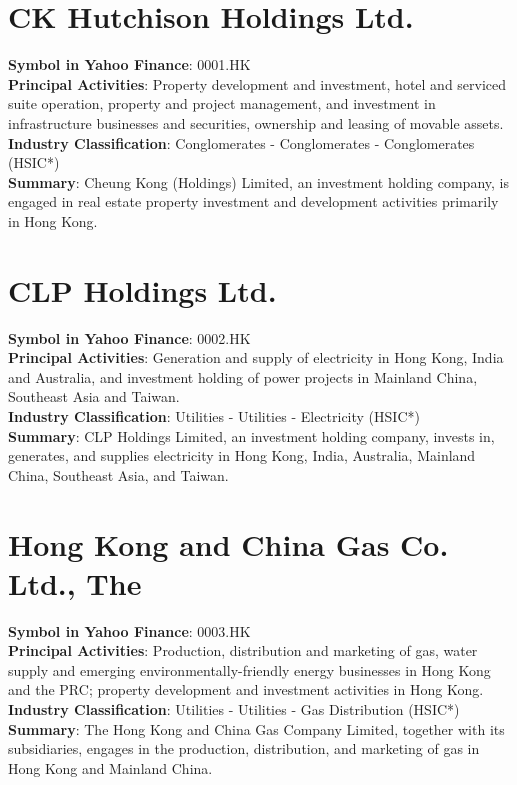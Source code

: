 


\section{CK Hutchison Holdings Ltd.}
\textbf{Symbol in Yahoo Finance}: 0001.HK\\
\textbf{Principal Activities}: Property development and investment, hotel and serviced suite operation, property and project management, and investment in infrastructure businesses and securities, ownership and leasing of movable assets.\\
\textbf{Industry Classification}: Conglomerates - Conglomerates - Conglomerates (HSIC*)\\
\textbf{Summary}: Cheung Kong (Holdings) Limited, an investment holding company, is engaged in real estate property investment and development activities primarily in Hong Kong.


\section{CLP Holdings Ltd.}
\textbf{Symbol in Yahoo Finance}: 0002.HK\\
\textbf{Principal Activities}: Generation and supply of electricity in Hong Kong, India and Australia, and investment holding of power projects in Mainland China, Southeast Asia and Taiwan.\\
\textbf{Industry Classification}: Utilities - Utilities - Electricity (HSIC*)\\
\textbf{Summary}: CLP Holdings Limited, an investment holding company, invests in, generates, and supplies electricity in Hong Kong, India, Australia, Mainland China, Southeast Asia, and Taiwan.


\section{Hong Kong and China Gas Co. Ltd., The}
\textbf{Symbol in Yahoo Finance}: 0003.HK\\
\textbf{Principal Activities}: Production, distribution and marketing of gas, water supply and emerging environmentally-friendly energy businesses in Hong Kong and the PRC; property development and investment activities in Hong Kong.\\
\textbf{Industry Classification}: Utilities - Utilities - Gas Distribution (HSIC*)\\
\textbf{Summary}: The Hong Kong and China Gas Company Limited, together with its subsidiaries, engages in the production, distribution, and marketing of gas in Hong Kong and Mainland China.


